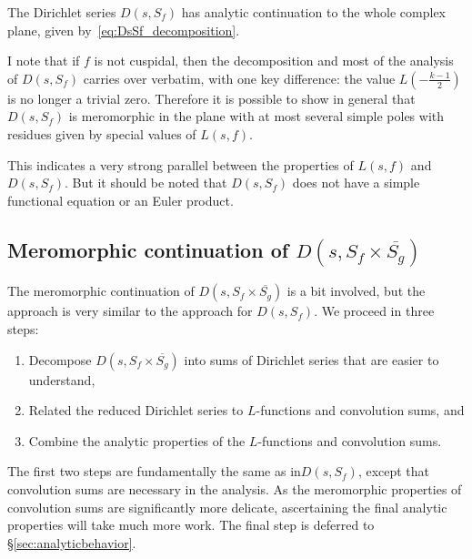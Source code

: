 \begin{corollary}
  The Dirichlet series $D(s, S_f)$ has analytic continuation to the whole complex plane,
  given by~\eqref{eq:DsSf_decomposition}.
\end{corollary}


\begin{remark}
  I note that if $f$ is not cuspidal, then the decomposition and most of the analysis of
  $D(s, S_f)$ carries over verbatim, with one key difference: the value
  $L(-\tfrac{k-1}{2})$ is no longer a trivial zero.
  Therefore it is possible to show in general that $D(s, S_f)$ is meromorphic in the plane
  with at most several simple poles with residues given by special values of $L(s, f)$.

  This indicates a very strong parallel between the properties of $L(s, f)$ and
  $D(s, S_f)$.
  But it should be noted that $D(s, S_f)$ does not have a simple functional equation or an
  Euler product.
\end{remark}



\subsection{Meromorphic continuation of $D(s, S_f \times \overline{S_g})$}
\label{ssec:mero_DsSfSg}


The meromorphic continuation of $D(s, S_f \times \overline{S_g})$ is a bit involved, but
the approach is very similar to the approach for $D(s, S_f)$.
We proceed in three steps:
\begin{enumerate}
  \item Decompose $D(s, S_f \times \overline{S_g})$ into sums of Dirichlet series that are
    easier to understand,
  \item Related the reduced Dirichlet series to $L$-functions and convolution sums, and
  \item Combine the analytic properties of the $L$-functions and convolution sums.
\end{enumerate}
The first two steps are fundamentally the same as in$D(s, S_f)$, except that convolution
sums are necessary in the analysis.
As the meromorphic properties of convolution sums are significantly more delicate,
ascertaining the final analytic properties will take much more work.
The final step is deferred to \S\ref{sec:analyticbehavior}.


